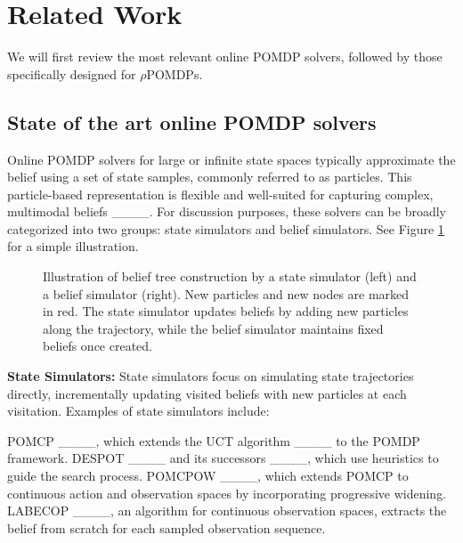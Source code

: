 \section{Related Work}
We will first review the most relevant online POMDP solvers, followed by those specifically designed for $\rho$POMDPs.
	\subsection{State of the art online POMDP solvers}

		Online POMDP solvers for large or infinite state spaces typically approximate the belief using a set of state samples, commonly referred to as particles. 
		This particle-based representation is flexible and well-suited for capturing complex, multimodal beliefs ____.
		For discussion purposes, these solvers can be broadly categorized into two groups: state simulators and belief simulators.
		See Figure \ref{fig:trees} for a simple illustration.

		\begin{figure}[tb]
			\centering
			
			\caption{Illustration of belief tree construction by a state simulator (left) and a belief simulator (right). New particles and new nodes are marked in red. The state simulator updates beliefs by adding new particles along the trajectory, while the belief simulator maintains fixed beliefs once created.}
			\label{fig:trees}
		\end{figure}


		\textbf{State Simulators:}
		State simulators focus on simulating state trajectories directly, incrementally updating visited beliefs with new particles at each visitation.
		Examples of state simulators include:
  
		POMCP ____, which extends the UCT algorithm ____ to the POMDP framework.  
		DESPOT ____ and its successors ____, which use heuristics to guide the search process.  
		POMCPOW ____, which extends POMCP to continuous action and observation spaces by incorporating progressive widening.  
		LABECOP ____, an algorithm for continuous observation spaces, extracts the belief from scratch for each sampled observation sequence.

